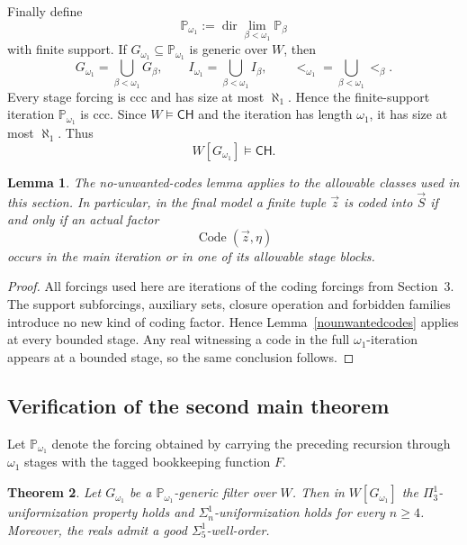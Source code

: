 \documentclass[a4paper,11pt]{article}
\newtheorem{theorem}{Theorem}[section]
\newtheorem{lemma}[theorem]{Lemma}
\newcommand{\forceP}{\mathbb{P}}
\newcommand{\CH}{\mathsf{CH}}
\begin{document}
Finally define
\[
\forceP_{\omega_1}
:=\operatorname{dir}\lim_{\beta<\omega_1}\forceP_\beta
\]
with finite support. If $G_{\omega_1}\subseteq\forceP_{\omega_1}$ is generic over $W$, then
\[
G_{\omega_1}=\bigcup_{\beta<\omega_1}G_\beta,
\qquad
I_{\omega_1}=\bigcup_{\beta<\omega_1}I_\beta,
\qquad
<_{\omega_1}=\bigcup_{\beta<\omega_1}<_\beta.
\]
Every stage forcing is ccc and has size at most $\aleph_1$. Hence the finite-support iteration $\forceP_{\omega_1}$ is ccc. Since $W\models\CH$ and the iteration has length $\omega_1$, it has size at most $\aleph_1$. Thus
\[
W[G_{\omega_1}]\models\CH.
\]

\begin{lemma}\label{NoUnwantedCodesSecondMainTheorem}
The no-unwanted-codes lemma applies to the allowable classes used in this section. In particular, in the final model a finite tuple $\vec z$ is coded into $\vec S$ if and only if an actual factor
\[
\operatorname{Code}(\vec z,\eta)
\]
occurs in the main iteration or in one of its allowable stage blocks.
\end{lemma}

\begin{proof}
All forcings used here are iterations of the coding forcings from Section~3. The support subforcings, auxiliary sets, closure operation and forbidden families introduce no new kind of coding factor. Hence Lemma~\ref{nounwantedcodes} applies at every bounded stage. Any real witnessing a code in the full $\omega_1$-iteration appears at a bounded stage, so the same conclusion follows.
\end{proof}

\subsection{Verification of the second main theorem}

Let $\forceP_{\omega_1}$ denote the forcing obtained by carrying the preceding recursion through $\omega_1$ stages with the tagged bookkeeping function $F$.

\begin{theorem}
Let $G_{\omega_1}$ be a $\forceP_{\omega_1}$-generic filter over $W$. Then in $W[G_{\omega_1}]$ the $\Pi^1_3$-uniformization property holds and $\Sigma^1_n$-uniformization holds for every $n\geq4$. Moreover, the reals admit a good $\Sigma^1_5$-well-order.
\end{theorem}
\end{document}
